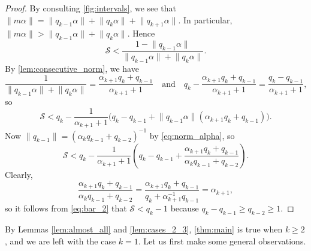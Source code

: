 \documentclass[a4paper,fleqn]{article}
\providecommand{\norm}[1]{\lVert#1\rVert}
\begin{document}
\begin{proof}
    By consulting \autoref{fig:intervals}, we see that
    $\norm{m\alpha} = \norm{q_{k-1}\alpha} + \norm{q_k\alpha} + \norm{q_{k+1}\alpha}$. In particular,
    $\norm{m\alpha} > \norm{q_{k-1}\alpha} + \norm{q_k\alpha}$. Hence
    \begin{equation*}
      \mathcal{S} < \frac{1 - \norm{q_{k-1}\alpha}}{\norm{q_{k-1}\alpha} + \norm{q_k\alpha}}.
    \end{equation*}
    By \autoref{lem:consecutive_norm}, we have
    \begin{equation*}
      \frac{1}{\norm{q_{k-1}\alpha} + \norm{q_k\alpha}} = \frac{\alpha_{k+1}q_k + q_{k-1}}{\alpha_{k+1} + 1} \quad \text{and} \quad q_k - \frac{\alpha_{k+1}q_k + q_{k-1}}{\alpha_{k+1} + 1} = \frac{q_k - q_{k-1}}{\alpha_{k+1} + 1},
    \end{equation*}
    so
    \begin{equation*}
      \mathcal{S} < q_k - \frac{1}{\alpha_{k+1} + 1}\Big( q_k - q_{k-1} + \norm{q_{k-1}\alpha}(\alpha_{k+1}q_k + q_{k-1})\Big).
    \end{equation*}
    Now $\norm{q_{k-1}} = (\alpha_k q_{k-1} + q_{k-2})^{-1}$ by \eqref{eq:norm_alpha}, so
    \begin{equation}\label{eq:bar_2}
      \mathcal{S} < q_k - \frac{1}{\alpha_{k+1} + 1}\left( q_k - q_{k-1} + \frac{\alpha_{k+1}q_k + q_{k-1}}{\alpha_k q_{k-1} + q_{k-2}} \right).
    \end{equation}
    Clearly,
    \begin{equation*}
      \frac{\alpha_{k+1}q_k + q_{k-1}}{\alpha_k q_{k-1} + q_{k-2}} = \frac{\alpha_{k+1}q_k + q_{k-1}}{q_k + \alpha_{k+1}^{-1}q_{k-1}} = \alpha_{k+1},
    \end{equation*}
    so it follows from \eqref{eq:bar_2} that $\mathcal{S} < q_k - 1$ because $q_k - q_{k-1} \geq q_{k-2} \geq 1$.
  \end{proof}

  By Lemmas \ref{lem:almost_all} and \ref{lem:cases_2_3}, \autoref{thm:main} is true when $k \geq 2$, and we are left
  with the case $k = 1$. Let us first make some general observations.
\end{document}

